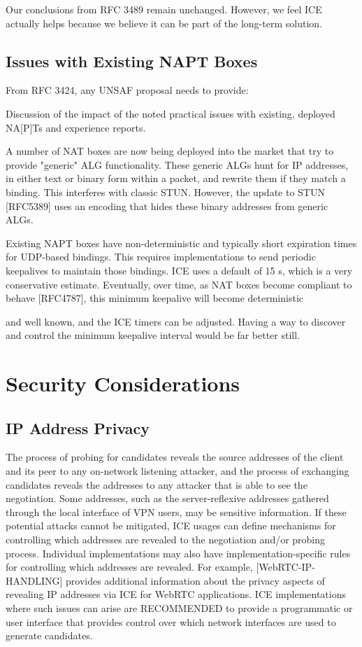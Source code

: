 \documentclass{article}
\begin{document}
Our conclusions from RFC 3489 remain unchanged.  However, we feel ICE actually helps because we believe it can be part of the long-term solution.

\subsection{Issues with Existing NAPT Boxes}

From RFC 3424, any UNSAF proposal needs to provide:

Discussion of the impact of the noted practical issues with existing, deployed NA[P]Ts and experience reports.

A number of NAT boxes are now being deployed into the market that try to provide "generic" ALG functionality.  These generic ALGs hunt for IP addresses, in either text or binary form within a packet, and rewrite them if they match a binding.  This interferes with classic STUN.  However, the update to STUN [RFC5389] uses an encoding that hides these binary addresses from generic ALGs.

Existing NAPT boxes have non-deterministic and typically short expiration times for UDP-based bindings.  This requires implementations to send periodic keepalives to maintain those bindings.  ICE uses a default of 15 s, which is a very conservative estimate.  Eventually, over time, as NAT boxes become compliant to behave [RFC4787], this minimum keepalive will become deterministic

and well known, and the ICE timers can be adjusted.  Having a way to discover and control the minimum keepalive interval would be far better still.

\section{Security Considerations}

\subsection{IP Address Privacy}

The process of probing for candidates reveals the source addresses of the client and its peer to any on-network listening attacker, and the process of exchanging candidates reveals the addresses to any attacker that is able to see the negotiation.  Some addresses, such as the server-reflexive addresses gathered through the local interface of VPN users, may be sensitive information.  If these potential attacks cannot be mitigated, ICE usages can define mechanisms for controlling which addresses are revealed to the negotiation and/or probing process.  Individual implementations may also have implementation-specific rules for controlling which addresses are revealed.  For example, [WebRTC-IP-HANDLING] provides additional information about the privacy aspects of revealing IP addresses via ICE for WebRTC applications.  ICE implementations where such issues can arise are RECOMMENDED to provide a programmatic or user interface that provides control over which network interfaces are used to generate candidates.
\end{document}
